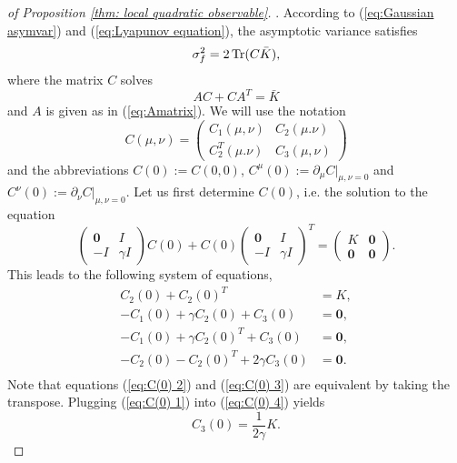 \begin{proof}[of Proposition \ref{thm: local quadratic observable}]. According to
	(\ref{eq:Gaussian asymvar}) and (\ref{eq:Lyapunov equation}), the
	asymptotic variance satisfies 
	\[
	\sigma_{f}^{2}=2\operatorname{Tr}(C\bar{K}),
	\]
	where the matrix $C$ solves 
	\begin{equation}
	AC+CA^{T}=\bar{K}\label{eq: lyap equation}
	\end{equation}
	and $A$ is given as in (\ref{eq:Amatrix}). We will use the notation
	\[
	C(\mu,\nu)=\left(\begin{array}{cc}
	C_{1}(\mu,\nu) & C_{2}(\mu.\nu)\\
	C_{2}^{T}(\mu.\nu) & C_{3}(\mu,\nu)
	\end{array}\right)
	\]
	and the abbreviations $C(0):=C(0,0)$, $C^{\mu}(0):=\partial_{\mu}C\vert_{\mu,\nu=0}$
	and $C^{\nu}(0):=\partial_{\nu}C\vert_{\mu,\nu=0}$.  Let us first determine $C(0)$, i.e. the solution to the equation
	\[
	\left(\begin{array}{cc}
	\boldsymbol{0} & I\\
	-I & \gamma I
	\end{array}\right)C(0)+C(0)\left(\begin{array}{cc}
	\boldsymbol{0} & I\\
	-I & \gamma I
	\end{array}\right)^{T}=\left(\begin{array}{cc}
	K & \boldsymbol{0}\\
	\boldsymbol{0} & \boldsymbol{0}
	\end{array}\right).
	\]
	This leads to the following system of equations,
	\begin{subequations}
	\begin{eqnarray}
	C_{2}(0)+C_{2}(0)^{T} & =K,
	\label{eq:C(0) 1}\\
	-C_{1}(0)+\gamma C_{2}(0)+C_{3}(0) & =\boldsymbol{0},
	\label{eq:C(0) 2}\\
	-C_{1}(0)+\gamma C_{2}(0)^{T}+C_{3}(0) & =\boldsymbol{0},
	\label{eq:C(0) 3}\\
	-C_{2}(0)-C_{2}(0)^{T}+2\gamma C_{3}(0) & =\boldsymbol{0}.\\ \label{eq:C(0) 4}
	\end{eqnarray}
	\end{subequations}
	Note that equations (\ref{eq:C(0) 2}) and (\ref{eq:C(0) 3}) are
	equivalent by taking the transpose. Plugging (\ref{eq:C(0) 1}) into
	(\ref{eq:C(0) 4}) yields 
	\begin{equation}
	C_{3}(0)=\frac{1}{2\gamma}K.\label{eq:C3(0) result}

\end{equation}
\end{proof}
